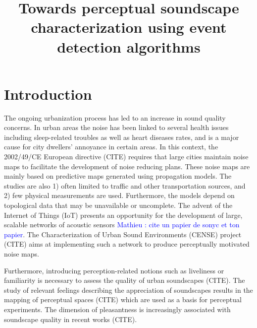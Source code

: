 \documentclass{article}
\title{Towards perceptual soundscape characterization using event detection algorithms}
\newcommand{\ml}[1]{\textcolor{blue}{ Mathieu : #1}}
\begin{document}
\ninept
\maketitle

\begin{sloppy}

\begin{abstract}

\end{abstract}

\begin{keywords}
\end{keywords}


\section{Introduction}
\label{sec:intro}

The ongoing urbanization process has led to an increase in sound quality concerns. In urban areas the noise has been linked to several health issues including sleep-related troubles as well as heart diseases rates, and is a major cause for city dwellers' annoyance in certain areas. In this context, the 2002/49/CE European directive (CITE) requires that large cities maintain noise maps to facilitate the development of noise reducing plans. These noise maps are mainly based on predictive maps generated using propagation models. The studies are also 1) often limited to traffic and other transportation sources, and 2) few physical measurements are used. Furthermore, the models depend on topological data that may be unavailable or uncomplete. The advent of the Internet of Things (IoT) presents an opportunity for the development of large, scalable networks of acoustic sensors \ml{cite un papier de sonyc et ton papier}. The Characterization of Urban Sound Environments (CENSE) project (CITE) aims at implementing such a network to produce perceptually motivated noise maps.

Furthermore, introducing perception-related notions such as liveliness or familiarity is necessary to assess the quality of urban soundscapes (CITE). The study of relevant feelings describing the appreciation of soundscapes results in the mapping of perceptual spaces (CITE) which are used as a basis for perceptual experiments. The dimension of pleasantness is increasingly associated with soundscape quality in recent works (CITE).


\end{sloppy}
\end{document}
